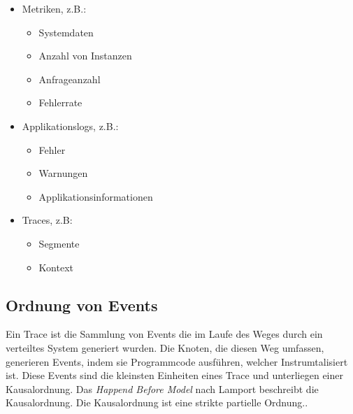	\begin{itemize}
		\item Metriken, z.B.:
		\begin{itemize}
			\item Systemdaten
			\item Anzahl von Instanzen
			\item Anfrageanzahl
			\item Fehlerrate
		\end{itemize}
		\item Applikationslogs, z.B.:
		\begin{itemize}
			\item Fehler
			\item Warnungen
			\item Applikationsinformationen
		\end{itemize}
		\item Traces, z.B:
		\begin{itemize}
			\item Segmente
			\item Kontext
		\end{itemize}
	\end{itemize}


\subsection{Ordnung von Events}
\label{subsection:Ordnung von Events}
	
Ein Trace ist die Sammlung von Events die im Laufe des Weges durch ein verteiltes System generiert wurden. Die Knoten, die diesen Weg umfassen, generieren Events, indem sie Programmcode ausführen, welcher Instrumtalisiert ist. Diese Events sind die kleinsten Einheiten eines Trace und unterliegen einer Kausalordnung. Das \emph{Happend Before Model} nach Lamport beschreibt die Kausalordnung. Die Kausalordnung ist eine strikte partielle Ordnung.. 

